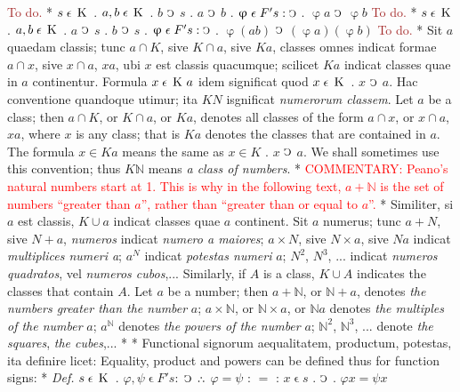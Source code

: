 \documentclass{book}
\newcommand{\C}{\mathop{\sbox0{$\displaystyle$$\reflectbox{C}$} %
\raisebox{-\height+\ht0-0.05cm}[\ht0][\dp0]{\scalebox{0.8}[0.8]{\copy0}}}\displaylimits} %
\newcommand{\pppNoSpace}{\leavevmode\lower0ex\hbox{.}\kern-0.1em\raise0.7ex\hbox{.}\kern-0.1em\lower0ex\hbox{.}} %
\newcommand{\smallIn}{\ensuremath{\mathrel{\epsilon}}}
\newcommand{\K}{\mathop{\thinspace \text{K} \thinspace}}
\newcommand\commentary[1]{\textcolor{red}{COMMENTARY: #1}}
\newcommand\todo{\textcolor{brown}{To do.}}
\newenvironment{translateTwoCol}
               { %
                 \columnratio{0.5, 0.5} \begin{paracol}{2}
                 \newcommand{\LAT}{\switchcolumn[0]*}
                 \newcommand{\ENG}{\switchcolumn[1]}
               }
               { %
                 \let\ENG\undefined
                 \let\LAT\undefined
                 \end{paracol}
               }
\begin{document}
\begin{translateTwoCol}
\ENG
\todo
\LAT
\hspace{1.06cm} $s \smallIn \K$ . $a,b \smallIn \K$ . $b$ $\C$ $s$ . $a$ $\C$ $b$ . $\upvarphi \smallIn F' s : \C$ . $\upvarphi a$ $\C$ $\upvarphi b$
\ENG
\todo
\LAT
\hspace{1.06cm} $s \smallIn \K$ . $a,b \smallIn \K$ . $a$ $\C$ $s$ . $b$ $\C$ $s$ . $\upvarphi \smallIn F' s : \C$ . $\upvarphi (ab)$ $\C$ $(\upvarphi a)(\upvarphi b)$
\ENG
\todo
\LAT
Sit $a$ quaedam classis; tunc $a \cap K$, sive $K \cap a$, sive $K a$, classes omnes indicat formae $a \cap x$, sive $x \cap a$, $x a$, ubi $x$ est classis quacumque; scilicet $K a$ indicat classes quae in $a$ continentur. Formula $x \smallIn \K a$ idem significat quod $x \smallIn \K$ . $x$ $\C$ $a$. Hac conventione quandoque utimur; ita $K N$ isgnificat \emph{numerorum classem}.
\ENG
Let $a$ be a class; then $a \cap K$, or $K \cap a$, or $K a$, denotes all classes of the form $a \cap x$, or $x \cap a$, $x a$, where $x$ is any class; that is $K a$ denotes the classes that are contained in $a$. The formula $x \in K a$ means the same as  $x \in K$ . $x$ $\C$ $a$. We shall sometimes use this convention; thus $K \mathbb{N}$ means \emph{a class of numbers}.
\LAT
\ENG
\commentary{Peano's natural numbers start at 1. This is why in the following text, $a + \mathbb{N}$ is the set of numbers ``greater than $a$'', rather than ``greater than or equal to $a$''.}
\LAT
Similiter, si $a$ est classis, $K \cup a$ indicat classes quae $a$ continent. Sit $a$ numerus; tunc $a + N$, sive $N + a$, \emph{numeros} indicat \emph{numero a maiores}; $a \times N$, sive $N \times a$, sive $N a$ indicat \emph{multiplices numeri a}; $a^N$ indicat \emph{potestas numeri} $a$; $N^2$, $N^3$, ... indicat \emph{numeros quadratos}, vel \emph{numeros cubos},...
\ENG
Similarly, if $A$ is a class, $K \cup A$ indicates the classes that contain $A$. Let $a$ be a number; then $a + \mathbb{N}$, or $\mathbb{N} + a$, denotes \emph{the numbers greater than the number} $a$; $a \times \mathbb{N}$, or $\mathbb{N} \times a$, or $\mathbb{N} a$ denotes \emph{the multiples of the number} $a$; $a^\mathbb{N}$ denotes \emph{the powers of the number} $a$; $\mathbb{N}^2$, $\mathbb{N}^3$, ... denote \emph{the squares}, \emph{the cubes},...
\LAT
\hfill
\ENG
\hfill
\LAT
Functional signorum aequalitatem, productum, potestas, ita definire licet:
\ENG
Equality, product and powers can be defined thus for function signs:
\LAT
\emph{Def.} \hspace{0.25cm} $s \smallIn \K$ . $\varphi, \psi \smallIn F' s :$ $\C$ $\pppNoSpace$ $\varphi = \psi$ : $=$ : $x \smallIn s$ . $\C$ . $\varphi x = \psi x$

\end{translateTwoCol}
\end{document}
